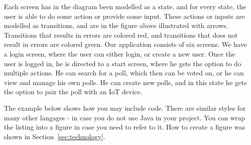 Each screen has in the diagram been modelled as a state, and for every state, the user is able to do some action or provide some input. 
These actions or inputs are modelled as transitions, and are in the figure above illustrated with arrows. Transitions that results in errors are 
colored red, and transitions that does not result in errors are colored green. Our application consists of six screens. We have a login screen, 
where the user can either login, or create a new user. Once the user is logged in, he is directed to a start screen, where he gets the option to 
do multiple actions. He can search for a poll, which then can be voted on, or he can view and manage his own polls. He can create new polls,
and in this state he gets the option to pair the poll with an IoT device. 

The example below shows how you may include code. There are similar
styles for many other langages - in case you do not use Java in your
project. You can wrap the listing into a figure in case you need to
refer to it. How to create a figure was shown in Section~\ref{sec:technology}.



